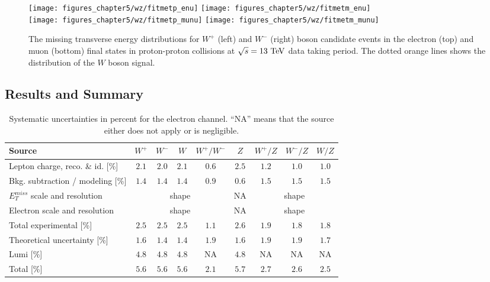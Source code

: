 \begin{figure}[h]
\centering
        \texttt{[image: figures\_chapter5/wz/fitmetp\_enu]}
        \texttt{[image: figures\_chapter5/wz/fitmetm\_enu]}\\
        \texttt{[image: figures\_chapter5/wz/fitmetp\_munu]}
        \texttt{[image: figures\_chapter5/wz/fitmetm\_munu]}
       \caption{The missing transverse energy distributions for
         $W^+$  (left) and $W^-$  (right) boson candidate events in the electron (top)
       and muon (bottom) final states in proton-proton collisions at $\sqrt{s}=13~\mathrm{Te\kern -0.1em V}$ data taking period. The dotted orange lines shows the distribution of the $W$ boson signal. 
       \label{fig:W13}}
\end{figure}

\subsection{Results and Summary}

\begin{table}[htbp]
\centering
\small
\begin {tabular}  {lcccccccc}
Source & $W^+$ & $W^-$ & $W$ & $W^+/W^-$ & $Z$ & $W^+/Z$ & $W^-/Z$ & $W/Z$ \\
\hline
Lepton charge, reco. \& id. [\%] & $2.1$ & $2.0$ & $2.1$ & $0.6$ & $2.5$ & $1.2$ & $1.0$ & $1.0$ \\
Bkg. subtraction / modeling [\%] & $1.4$ & $1.4$ & $1.4$ & $0.9$ & $0.6$ & $1.5$ & $1.5$ & $1.5$ \\ 
$E_{T}^{miss}$ scale and resolution  & \multicolumn{4}{c}{shape}  & NA & \multicolumn{3}{c}{shape}  \\ 
Electron scale and resolution & \multicolumn{4}{c}{shape}  & NA & \multicolumn{3}{c}{shape}  \\ 
\hline
Total experimental [\%] & $2.5$ & $2.5$ & $2.5$ & $1.1$ & $2.6$ & $1.9$ & $1.8$ & $1.8$ \\
\hline
Theoretical uncertainty [\%] & $1.6$ & $1.4$ & $1.4$ & $1.9$ & $1.6$ & $1.9$ & $1.9$ & $1.7$ \\
\hline
Lumi [\%] & $4.8$ & $4.8$ & $4.8$ & NA & $4.8$ & NA & NA & NA \\
\hline
Total [\%] & $5.6$ & $5.6$ & $5.6$ & $2.1$ & $5.7$ & $2.7$ & $2.6$ & $2.5$ \\
\end {tabular} 
\caption[.]{ \label{tab:syst_el}
Systematic uncertainties in percent for the electron channel. ``NA'' means that the source either does not apply or is negligible.}
\end{table}


